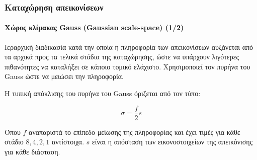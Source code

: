 \documentclass{beamer}
\begin{document}
\begin{frame}
\frametitle{Καταχώρηση απεικονίσεων}
\framesubtitle{Χώρος κλίμακας Gauss (Gaussian scale-space) (1/2)}

Ιεραρχική διαδικασία κατά την οποία η πληροφορία των απεικονίσεων αυξάνεται
από τα αρχικά προς τα τελικά στάδια της καταχώρησης, ώστε να υπάρχουν λιγότερες
πιθανότητες να καταλήξει σε κάποιο τομικό ελάχιστο. Χρησιμοποιεί τον πυρήνα του
Gauss ώστε να μειώσει την πληροφορία.


Η τυπική απόκλισης του πυρήνα του Gauss όριζεται από τον τύπο:

\begin{equation*}
    \sigma = \frac {f} {2} s
\end{equation*}

Όπου $f$ αναπαριστά το επίπεδο μείωσης της πληροφορίας και έχει τιμές για κάθε
στάδιο $8,4,2,1$ αντίστοιχα. $s$ είναι η απόσταση των εικονοστοιχείων της
απεικόνισης για κάθε διάσταση.


\end{frame}
\end{document}
